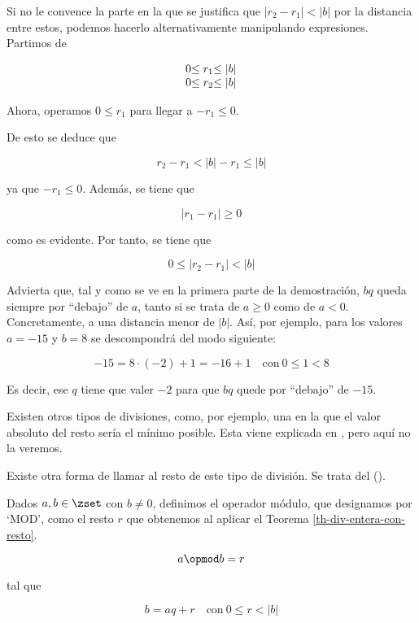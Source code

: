 Si no le convence la parte en la que se justifica que $|r_2 - r_1| < |b|$
por la distancia entre estos, podemos hacerlo alternativamente manipulando
expresiones. Partimos de

\[
  \begin{array}{c@{}c@{}c}
    0 &\leq r_1 &\leq |b| \\
    0 &\leq r_2 &\leq |b|
  \end{array}
\]

Ahora, operamos $0 \leq r_1$ para llegar a ${-r_1} \leq 0$.

De esto se deduce que

\[ r_2 - r_1 < |b| - r_1 \leq |b| \]

\noindent ya que ${-r_1} \leq 0$. Además, se tiene que

\[ |r_1 - r_1| \geq 0 \]

\noindent como es evidente. Por tanto, se tiene que

\[ 0 \leq |r_2 - r_1| < |b| \]

Advierta que, tal y como se ve en la primera parte de la demostración, $bq$
queda siempre por ``debajo'' de $a$, tanto si se trata de $a \geq 0$ como de
$a < 0$. Concretamente, a una distancia menor de $|b|$. Así, por ejemplo,
para los valores $a = {-15}$ y $b = 8$ se descompondrá del modo siguiente:

$$ {-15} = 8 \cdot ({-2}) + 1 = {-16} + 1 \quad \text{con} \ 0 \leq 1 < 8 $$

\noindent Es decir, ese $q$ tiene que valer ${-2}$ para que $bq$ quede por
``debajo'' de ${-15}$.

Existen otros tipos de divisiones, como, por ejemplo, una en la que el valor
absoluto del resto sería el mínimo posible. Esta viene explicada en
\cite{weissman}, pero aquí no la veremos.

Existe otra forma de llamar al resto de este tipo de división. Se trata del
 ().

\begin{deffinition}
  Dados $a, b \in \zset$ con $b \neq 0$, definimos el operador módulo, que
  designamos por `$\mathrm{MOD}$', como el resto $r$ que obtenemos al
  aplicar el Teorema \ref{th-div-entera-con-resto}.

  $$ a \opmod b = r $$

  \noindent tal que

  $$ b = aq + r \quad \text{con} \ 0 \leq r < |b| $$
\end{deffinition}

